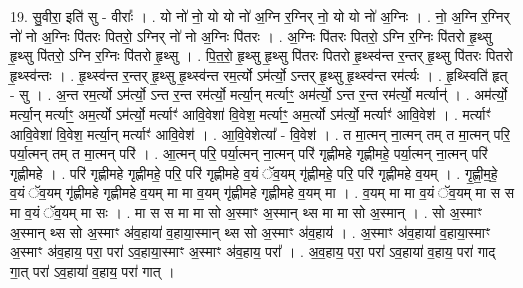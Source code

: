 \documentclass[17pt]{extarticle}
\begin{document}
19. सु॒वीरा॒ इति॑ सु - वीराः᳚ । . यो नो॑ नो॒ यो यो नो॑ अ॒ग्नि र॒ग्निर् नो॒ यो यो नो॑ अ॒ग्निः । . नो॒ अ॒ग्नि र॒ग्निर् नो॑ नो अ॒ग्निः पि॑तरः पितरो॒ ऽग्निर् नो॑ नो अ॒ग्निः पि॑तरः । . अ॒ग्निः पि॑तरः पितरो॒ ऽग्नि र॒ग्निः पि॑तरो हृ॒थ्सु हृ॒थ्सु पि॑तरो॒ ऽग्नि र॒ग्निः पि॑तरो हृ॒थ्सु । . पि॒त॒रो॒ हृ॒थ्सु हृ॒थ्सु पि॑तरः पितरो हृ॒थ्स्व॑न्त र॒न्तर् हृ॒थ्सु पि॑तरः पितरो हृ॒थ्स्व॑न्तः । . हृ॒थ्स्व॑न्त र॒न्तर् हृ॒थ्सु हृ॒थ्स्व॑न्त रम॒र्त्यो ऽम॑र्त्यो॒ ऽन्तर् हृ॒थ्सु हृ॒थ्स्व॑न्त रम॑र्त्यः । . हृ॒थ्स्विति॑ हृत् - सु । . अ॒न्त रम॒र्त्यो ऽम॑र्त्यो॒ ऽन्त र॒न्त रम॑र्त्यो॒ मर्त्या॒न् मर्त्याꣳ॒॒ अम॑र्त्यो॒ ऽन्त र॒न्त रम॑र्त्यो॒ मर्त्यान्॑ । . अम॑र्त्यो॒ मर्त्या॒न् मर्त्याꣳ॒॒ अम॒र्त्यो ऽम॑र्त्यो॒ मर्त्याꣳ॑ आवि॒वेशा॑ वि॒वेश॒ मर्त्याꣳ॒॒ अम॒र्त्यो ऽम॑र्त्यो॒ मर्त्याꣳ॑ आवि॒वेश॑ । . मर्त्याꣳ॑ आवि॒वेशा॑ वि॒वेश॒ मर्त्या॒न् मर्त्याꣳ॑ आवि॒वेश॑ । . आ॒वि॒वेशेत्या᳚ - वि॒वेश॑ । . त मा॒त्मन् ना॒त्मन् तम् त मा॒त्मन् परि॒ पर्या॒त्मन् तम् त मा॒त्मन् परि॑ । . आ॒त्मन् परि॒ पर्या॒त्मन् ना॒त्मन् परि॑ गृह्णीमहे गृह्णीमहे॒ पर्या॒त्मन् ना॒त्मन् परि॑ गृह्णीमहे । . परि॑ गृह्णीमहे गृह्णीमहे॒ परि॒ परि॑ गृह्णीमहे व॒यं ॅव॒यम् गृ॑ह्णीमहे॒ परि॒ परि॑ गृह्णीमहे व॒यम् । . गृ॒ह्णी॒म॒हे॒ व॒यं ॅव॒यम् गृ॑ह्णीमहे गृह्णीमहे व॒यम् मा मा व॒यम् गृ॑ह्णीमहे गृह्णीमहे व॒यम् मा । . व॒यम् मा मा व॒यं ॅव॒यम् मा स स मा व॒यं ॅव॒यम् मा सः । . मा स स मा मा सो अ॒स्माꣳ अ॒स्मान् थ्स मा मा सो अ॒स्मान् । . सो अ॒स्माꣳ अ॒स्मान् थ्स सो अ॒स्माꣳ अ॑व॒हाया॑ व॒हाया॒स्मान् थ्स सो अ॒स्माꣳ अ॑व॒हाय॑ । . अ॒स्माꣳ अ॑व॒हाया॑ व॒हाया॒स्माꣳ अ॒स्माꣳ अ॑व॒हाय॒ परा॒ परा॑ ऽव॒हाया॒स्माꣳ अ॒स्माꣳ अ॑व॒हाय॒ परा᳚ । . अ॒व॒हाय॒ परा॒ परा॑ ऽव॒हाया॑ व॒हाय॒ परा॑ गाद् गा॒त् परा॑ ऽव॒हाया॑ व॒हाय॒ परा॑ गात् । \newline
\end{document}
